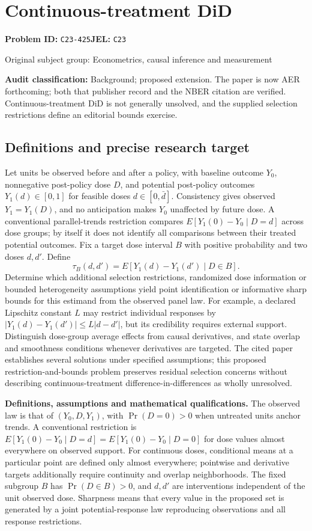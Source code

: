 \documentclass[11pt,a4paper]{article}
\begin{document}
\section*{Continuous-treatment DiD}
\textbf{Problem ID:} \texttt{C23-425}\quad \textbf{JEL:} \texttt{C23}\par
\label{problem:OP-0423}
{\sffamily\small\color{muted}Original subject group: Econometrics, causal inference and measurement\par}
\label{definitions:problem:30007705}
\textbf{Audit classification:} Background; proposed extension. The paper is now AER forthcoming; both that publisher record and the NBER citation are verified. Continuous-treatment DiD is not generally unsolved, and the supplied selection restrictions define an editorial bounds exercise.
\subsection*{Definitions and precise research target}
Let units be observed before and after a policy, with baseline outcome \(Y_0\), nonnegative post-policy dose \(D\), and potential post-policy outcomes \(Y_1(d)\in[0,1]\) for feasible doses \(d\in[0,\bar d]\). Consistency gives observed \(Y_1=Y_1(D)\), and no anticipation makes \(Y_0\) unaffected by future dose. A conventional parallel-trends restriction compares \(E[Y_1(0)-Y_0\mid D=d]\) across dose groups; by itself it does not identify all comparisons between their treated potential outcomes. Fix a target dose interval \(B\) with positive probability and two doses \(d,d'\). Define
\[
\tau_B(d,d')=E[Y_1(d)-Y_1(d')\mid D\in B].
\]
Determine which additional selection restrictions, randomized dose information or bounded heterogeneity assumptions yield point identification or informative sharp bounds for this estimand from the observed panel law. For example, a declared Lipschitz constant \(L\) may restrict individual responses by \(|Y_1(d)-Y_1(d')|\leq L|d-d'|\), but its credibility requires external support. Distinguish dose-group average effects from causal derivatives, and state overlap and smoothness conditions whenever derivatives are targeted. The cited paper establishes several solutions under specified assumptions; this proposed restriction-and-bounds problem preserves residual selection concerns without describing continuous-treatment difference-in-differences as wholly unresolved.

\textbf{Definitions, assumptions and mathematical qualifications.} The observed law is that of \((Y_0,D,Y_1)\), with \(\Pr(D=0)>0\) when untreated units anchor trends. A conventional restriction is \(E[Y_1(0)-Y_0\mid D=d]=E[Y_1(0)-Y_0\mid D=0]\) for dose values almost everywhere on observed support. For continuous doses, conditional means at a particular point are defined only almost everywhere; pointwise and derivative targets additionally require continuity and overlap neighborhoods. The fixed subgroup \(B\) has \(\Pr(D\in B)>0\), and \(d,d'\) are interventions independent of the unit observed dose. Sharpness means that every value in the proposed set is generated by a joint potential-response law reproducing observations and all response restrictions.
\end{document}
